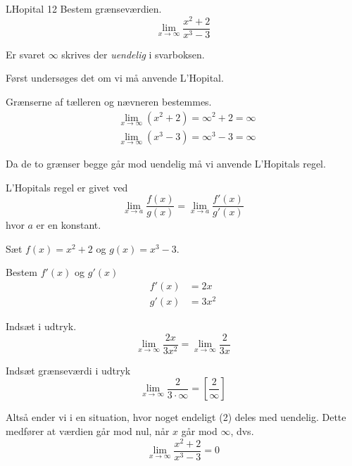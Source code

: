 \documentclass{article}
\begin{document}
\begin{exercise}{LHopital 12}
Bestem grænseværdien.
\[
\lim_{x \to \infty} \frac{x^2 + 2}{x^3 - 3}
\] 

Er svaret $\infty$ skrives der \emph{uendelig} i svarboksen.


\hint
Først undersøges det om vi må anvende L'Hopital.

\hint
Grænserne af tælleren og nævneren bestemmes.
\begin{align*}
	&\lim_{x \to \infty} (x^2 + 2) = \infty ^2 + 2 = \infty \\
	&\lim_{x \to \infty} (x^3 - 3) = \infty ^3 - 3 = \infty
\end{align*}

\hint
Da de to grænser begge går mod uendelig må vi  anvende L'Hopitals regel. 

\hint
L'Hopitals regel er givet ved
\[
\lim_{x \to a} \frac{f(x)}{g(x)} = \lim_{x \to a} \frac{f'(x)}{g'(x)} 
\]
hvor $a$  er en konstant.

\hint
Sæt $f(x) = x^2 + 2$ og $g(x) = x^3 - 3$. 

\hint
Bestem $f'(x)$ og $g'(x)$
\begin{align*}
	f'(x) &= 2x \\
	g'(x) &= 3x^2
\end{align*}

\hint
Indsæt i udtryk.
\[
\lim_{x \to \infty} \frac{2x}{3x^2} = \lim_{x \to \infty} \frac{2}{3x} 
\]

\hint
Indsæt grænseværdi i udtryk
\[
\lim_{x \to \infty} \frac{2}{3 \cdot \infty}  = \left[ \frac{2}{\infty}  \right] 
\]

\hint
Altså ender vi i en situation, hvor noget endeligt (2) deles med uendelig. Dette medfører at værdien går mod nul, når $x$ går mod $\infty$, dvs.
\[
\lim_{x \to \infty} \frac{x^2 + 2}{x^3 - 3} = 0
\]

\end{exercise}
\end{document}
